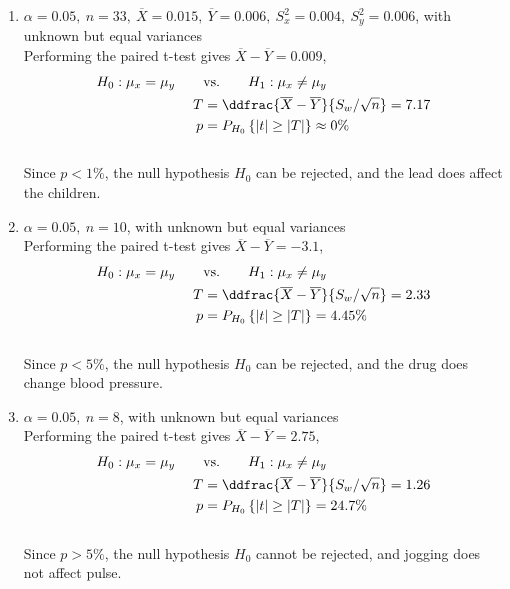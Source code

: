 \begin{enumerate}
	\item $\alpha = 0.05,\ n = 33,\ \overline{X} = 0.015,\ \overline{Y} = 0.006,\ S_x^2 = 0.004,\ S_y^2 = 0.006$, with unknown but equal variances\\
	Performing the paired t-test gives $ \overline{X} - \overline{Y} = 0.009 $,\\
	
	\begin{align}
		H_0 : \mu_x = \mu_y \qquad &\text{vs.} \qquad H_1 : \mu_x \neq \mu_y \nonumber \\
		T &= \ddfrac{ \overline{X} - \overline{Y} }{S_w/\sqrt{n}} = 7.17 \nonumber \\
		p &= P_{H_0}\left\{|t| \geq |T|\right\} \approx 0\% 
	\end{align}\\
	Since $ p < 1\% $, the null hypothesis $ H_0 $ can be rejected, and the lead does affect the children.\\
	
	\item $\alpha = 0.05,\ n = 10$, with unknown but equal variances\\
	Performing the paired t-test gives $ \overline{X} - \overline{Y} = -3.1 $,\\
	
	\begin{align}
		H_0 : \mu_x = \mu_y \qquad &\text{vs.} \qquad H_1 : \mu_x \neq \mu_y \nonumber \\
		T &= \ddfrac{ \overline{X} - \overline{Y} }{S_w/\sqrt{n}} = 2.33 \nonumber \\
		p &= P_{H_0}\left\{|t| \geq |T|\right\} = 4.45\% 
	\end{align}\\
	Since $ p < 5\% $, the null hypothesis $ H_0 $ can be rejected, and the drug does change blood pressure.\\
	
	\item $\alpha = 0.05,\ n = 8$, with unknown but equal variances\\
	Performing the paired t-test gives $ \overline{X} - \overline{Y} = 2.75 $,\\
	
	\begin{align}
		H_0 : \mu_x = \mu_y \qquad &\text{vs.} \qquad H_1 : \mu_x \neq \mu_y \nonumber \\
		T &= \ddfrac{ \overline{X} - \overline{Y} }{S_w/\sqrt{n}} = 1.26 \nonumber \\
		p &= P_{H_0}\left\{|t| \geq |T|\right\} = 24.7\% 
	\end{align}\\
	Since $ p > 5\% $, the null hypothesis $ H_0 $ cannot be rejected, and jogging does not affect pulse.\\
	

\end{enumerate}
